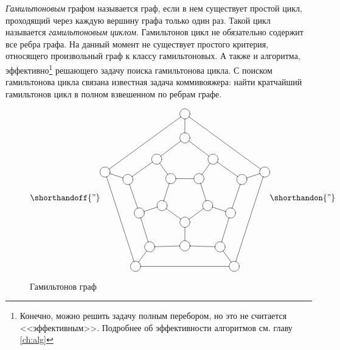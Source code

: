\emph{Гамильтоновым} графом называется граф, если в нем существует простой цикл, проходящий через каждую вершину графа только один раз. Такой цикл называется \emph{гамильтоновым циклом}. Гамильтонов цикл не обязательно содержит все ребра графа. На данный момент не существует простого критерия, относящего произвольный граф к классу гамильтоновых. А также и алгоритма, эффективно\footnote{Конечно, можно решить задачу полным перебором, но это не считается <<эффективным>>. Подробнее об эффективности алгоритмов см. главу \ref{ch:alg}} решающего задачу поиска гамильтонова цикла. С поиском гамильтонова цикла связана известная задача коммивояжера: найти кратчайший гамильтонов цикл в полном взвешенном по ребрам графе.
\begin{figure}
    \[
        \shorthandoff{"}
        \begin{xy}
            \POS (0.00,-10.00)*++[o][F-]{}="a1"
            \POS (-9.51,-3.09)*++[o][F-]{}="b1"
            \POS (-5.88,8.09)*++[o][F-]{}="c1"
            \POS (5.88,8.09)*++[o][F-]{}="d1"
            \POS (9.51,-3.09)*++[o][F-]{}="e1"
            \POS (0.00,-19.81)*++[o][F-]{}="a2"
            \POS (-19.02,-6.18)*++[o][F-]{}="b2"
            \POS (-11.76,16.18)*++[o][F-]{}="c2"
            \POS (11.76,16.18)*++[o][F-]{}="d2"
            \POS (19.02,-6.18)*++[o][F-]{}="e2"
            \POS (0.00,25.00)*++[o][F-]{}="a3"
            \POS (23.78,7.73)*++[o][F-]{}="b3"
            \POS (14.69,-20.23)*++[o][F-]{}="c3"
            \POS (-14.69,-20.23)*++[o][F-]{}="d3"
            \POS (-23.78,7.73)*++[o][F-]{}="e3"
            \POS (0.00,35.00)*++[o][F-]{}="a4"
            \POS (33.29,10.82)*++[o][F-]{}="b4"
            \POS (20.57,-28.32)*++[o][F-]{}="c4"
            \POS (-20.57,-28.32)*++[o][F-]{}="d4"
            \POS (-33.29,10.82)*++[o][F-]{}="e4"
            \POS"a1" \ar @{-} "b1"
            \POS"b1" \ar @{-} "c1"
            \POS"c1" \ar @{-} "d1"
            \POS"d1" \ar @{-} "e1"
            \POS"e1" \ar @{-} "a1"
            \POS"a4" \ar @{-} "b4"
            \POS"b4" \ar @{-} "c4"
            \POS"c4" \ar @{-} "d4"
            \POS"d4" \ar @{-} "e4"
            \POS"e4" \ar @{-} "a4"
            \POS"a1" \ar @{-} "a2"
            \POS"b1" \ar @{-} "b2"
            \POS"c1" \ar @{-} "c2"
            \POS"d1" \ar @{-} "d2"
            \POS"e1" \ar @{-} "e2"
            \POS"a3" \ar @{-} "a4"
            \POS"b3" \ar @{-} "b4"
            \POS"c3" \ar @{-} "c4"
            \POS"d3" \ar @{-} "d4"
            \POS"e3" \ar @{-} "e4"
            \POS"a2" \ar @{-} "d3"
            \POS"b2" \ar @{-} "e3"
            \POS"c2" \ar @{-} "a3"
            \POS"d2" \ar @{-} "b3"
            \POS"e2" \ar @{-} "c3"
            \POS"a2" \ar @{-} "c3"
            \POS"b2" \ar @{-} "d3"
            \POS"c2" \ar @{-} "e3"
            \POS"d2" \ar @{-} "a3"
            \POS"e2" \ar @{-} "b3" 
        \end{xy}
        \shorthandon{"}            
    \]
    \caption{Гамильтонов граф}
    \label{fig:graph:gamilton}
\end{figure}

